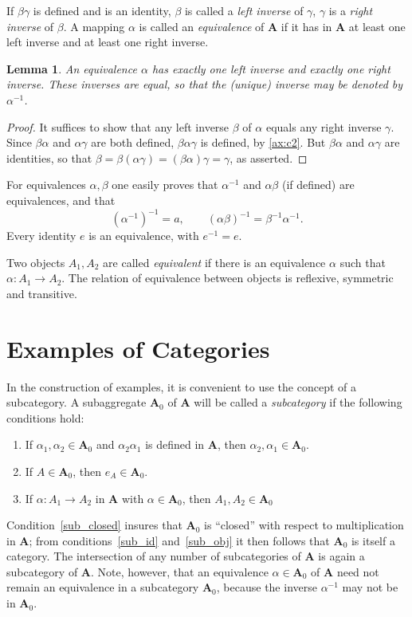 \documentclass[11pt,a4paper]{report}
\newtheorem{lemma}{Lemma}
\begin{document}
If $\beta\gamma$ is defined and is an identity, $\beta$ is called a \emph{left inverse} of $\gamma$, $\gamma$ is a
\emph{right inverse} of $\beta$. A mapping $\alpha$ is called an \emph{equivalence} of $\mathbf{A}$ if it has in 
$\mathbf{A}$ at least one left inverse and at least one right inverse.
\begin{lemma}
	An equivalence $\alpha$ has exactly one left inverse and exactly one right inverse. These inverses are equal,
	so that the (unique) inverse may be denoted by $\alpha^{-1}$.
\end{lemma}
\begin{proof}
	It suffices to show that any left inverse $\beta$ of $\alpha$ equals any right inverse $\gamma$. Since $\beta\alpha$
	and $\alpha\gamma$ are both defined, $\beta\alpha\gamma$ is defined, by \cref{ax:c2}. But $\beta\alpha$ and $\alpha\gamma$
	are identities, so that $\beta=\beta(\alpha\gamma)=(\beta\alpha)\gamma=\gamma$, as asserted.
\end{proof}

For equivalences $\alpha,\beta$ one easily proves that $\alpha^{-1}$ and $\alpha\beta$ (if defined) are equivalences, and that
\begin{equation*}
	{(\alpha^{-1})}^{-1}=a,\qquad {(\alpha\beta)}^{-1}=\beta^{-1}\alpha^{-1}.
\end{equation*}
Every identity $e$ is an equivalence, with $e^{-1}=e$.

Two objects $A_1,A_2$ are called \emph{equivalent} if there is an equivalence $\alpha$ such that $\alpha:A_1\rightarrow A_2$.
The relation of equivalence between objects is reflexive, symmetric and transitive.

\section{Examples of Categories}\label{sec:ex_cat}
In the construction of examples, it is convenient to use the concept of a subcategory. A subaggregate $\mathbf{A}_0$ of
$\mathbf{A}$ will be called a \emph{subcategory} if the following conditions hold:
\begin{enumerate}
	\item If $\alpha_1,\alpha_2\in\mathbf{A}_0$ and $\alpha_2\alpha_1$ is defined in $\mathbf{A}$, then
		$\alpha_2,\alpha_1\in\mathbf{A}_0$.\label{sub_closed}
	\item If $A\in\mathbf{A}_0$, then $e_A\in\mathbf{A}_0$.\label{sub_id}
	\item If $\alpha:A_1\rightarrow A_2$ in $\mathbf{A}$ with $\alpha\in\mathbf{A}_0$,
		then $A_1,A_2\in\mathbf{A}_0$\label{sub_obj}
\end{enumerate}
Condition~\ref{sub_closed} insures that $\mathbf{A}_0$ is ``closed'' with respect to multiplication in $\mathbf{A}$;
from conditions~\ref{sub_id} and~\ref{sub_obj} it then follows that $\mathbf{A}_0$ is itself a category. The intersection
of any number of subcategories of $\mathbf{A}$ is again a subcategory of $\mathbf{A}$. Note, however, that an equivalence
$\alpha\in\mathbf{A}_0$ of $\mathbf{A}$ need not remain an equivalence in a subcategory $\mathbf{A}_0$, because the
inverse $\alpha^{-1}$ may not be in $\mathbf{A}_0$.
\end{document}
